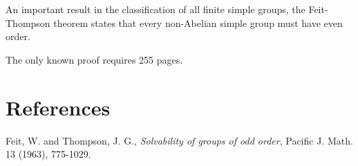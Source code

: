 \documentclass[12pt]{article}
\newcommand{\<}{\langle}
\renewcommand{\>}{\rangle}
\begin{document}
An important result in the classification of all finite simple groups, the  Feit-Thompson theorem states that every non-Abelian simple group must have even order.

The only known proof requires 255 pages.

\section{References}
Feit, W. and Thompson, J. G., {\it Solvability of groups of odd order}, Pacific J. Math. 13 (1963), 775-1029.
\end{document}
